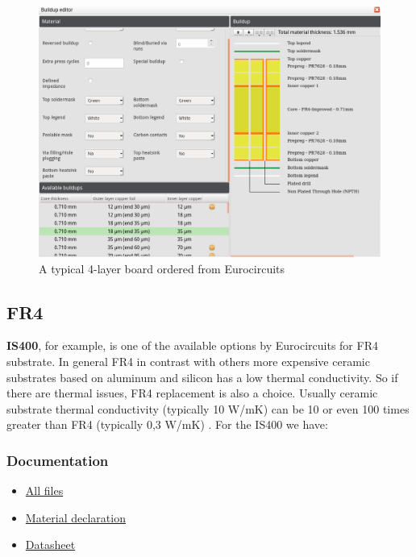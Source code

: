 \documentclass[final]{cubedoc}
\begin{document}
	
	\begin{figure}[h!]
		\centering
		\includegraphics[keepaspectratio, height=0.35\textheight, width=\textwidth]{docs/stackup.png}
		\caption{A typical 4-layer board ordered from Eurocircuits}
		\label{fig:my_label}
	\end{figure}{}
	
	
	\subsection{FR4}
	
	\textbf{IS400}, for example, is one of the  available options by Eurocircuits for FR4 substrate. In general FR4 in contrast with others more expensive ceramic substrates based on aluminum and silicon has a low thermal conductivity. So if there are thermal issues, FR4 replacement is also a choice. Usually ceramic substrate thermal conductivity (typically 10 W/mK) can be 10 or even 100 times greater than FR4 (typically 0,3 W/mK) \cite{zotero-57, zotero-56}. For the IS400 we have:
	
	\subsubsection{Documentation}
	
	\begin{itemize}
		\item \href{https://www.isola-group.com/products/all-printed-circuit-materials/is400/}{All files}
		\item \href{https://web.archive.org/web/20200818140037/https://www.isola-group.com/wp-content/uploads/IS400MaterialDeclaration2007.pdf}{Material declaration}
		\item \href{https://web.archive.org/web/20200818140113/https://www.isola-group.com/wp-content/uploads/data-sheets/is400.pdf?v=1585950502}{Datasheet}
	\end{itemize}
	
\end{document}
